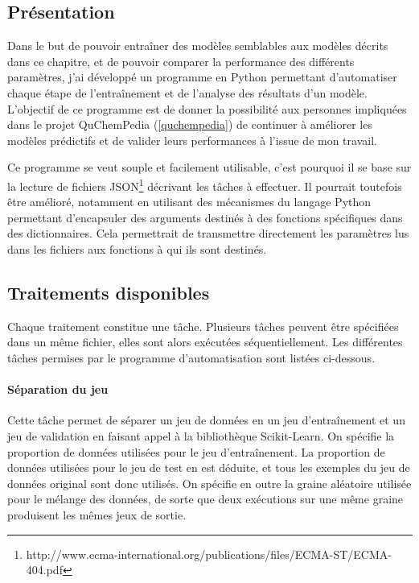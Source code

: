 \subsection{Présentation}
Dans le but de pouvoir entraîner des modèles semblables aux modèles décrits dans ce chapitre, et de pouvoir comparer la performance des différents paramètres, j'ai développé un programme en Python permettant d'automatiser chaque étape de l'entraînement et de l'analyse des résultats d'un modèle. L'objectif de ce programme est de donner la possibilité aux personnes impliquées dans le projet QuChemPedia (\ref{quchempedia}) de continuer à améliorer les modèles prédictifs et de valider leurs performances à l'issue de mon travail.\\

\par Ce programme se veut souple et facilement utilisable, c'est pourquoi il se base sur la lecture de fichiers JSON\footnote{http://www.ecma-international.org/publications/files/ECMA-ST/ECMA-404.pdf} décrivant les tâches à effectuer. Il pourrait toutefois être amélioré, notamment en utilisant des mécanismes du langage Python permettant d'encapsuler des arguments destinés à des fonctions spécifiques dans des dictionnaires. Cela permettrait de transmettre directement les paramètres lus dans les fichiers aux fonctions à qui ils sont destinés.

\subsection{Traitements disponibles}

Chaque traitement constitue une tâche. Plusieurs tâches peuvent être spécifiées dans un même fichier, elles sont alors exécutées séquentiellement. Les différentes tâches permises par le programme d'automatisation sont listées ci-dessous.

\paragraph{Séparation du jeu} Cette tâche permet de séparer un jeu de données en un jeu d'entraînement et un jeu de validation en faisant appel à la bibliothèque Scikit-Learn\cite{sklearn}. On spécifie la proportion de données utilisées pour le jeu d'entraînement. La proportion de données utilisées pour le jeu de test en est déduite, et tous les exemples du jeu de données original sont donc utilisés. On spécifie en outre la graine aléatoire utilisée pour le mélange des données, de sorte que deux exécutions sur une même graine produisent les mêmes jeux de sortie.


